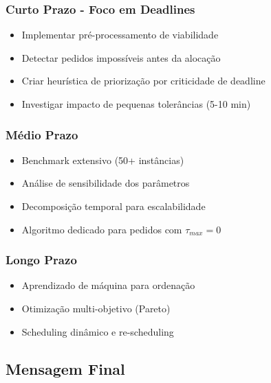 \documentclass[11pt,a4paper]{article}
\begin{document}
\subsubsection{Curto Prazo - Foco em Deadlines}
\begin{itemize}
    \item Implementar pré-processamento de viabilidade
    \item Detectar pedidos impossíveis antes da alocação
    \item Criar heurística de priorização por criticidade de deadline
    \item Investigar impacto de pequenas tolerâncias (5-10 min)
\end{itemize}

\subsubsection{Médio Prazo}
\begin{itemize}
    \item Benchmark extensivo (50+ instâncias)
    \item Análise de sensibilidade dos parâmetros
    \item Decomposição temporal para escalabilidade
    \item Algoritmo dedicado para pedidos com $\tau_{max} = 0$
\end{itemize}

\subsubsection{Longo Prazo}
\begin{itemize}
    \item Aprendizado de máquina para ordenação
    \item Otimização multi-objetivo (Pareto)
    \item Scheduling dinâmico e re-scheduling
\end{itemize}

\subsection{Mensagem Final}

\begin{center}
\end{center}
\end{document}
